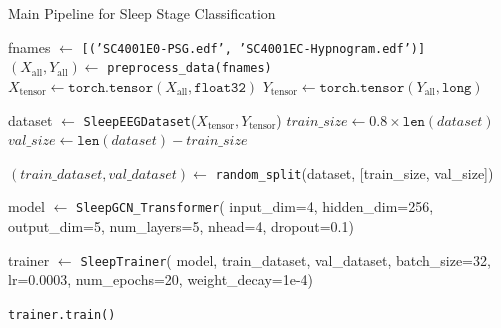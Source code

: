  \begin{algorithm*}[!t]
 	\caption{Main Pipeline for Sleep Stage Classification}
 	\label{alg:main}
 	
 	
 	fnames $\gets$ \texttt{[('SC4001E0-PSG.edf', 'SC4001EC-Hypnogram.edf')]} \;
 	$(X_{\text{all}}, Y_{\text{all}}) \gets$ \texttt{preprocess\_data(fnames)} \;
 	$X_{\text{tensor}} \gets \texttt{torch.tensor}(X_{\text{all}}, \texttt{float32})$ \;
 	$Y_{\text{tensor}} \gets \texttt{torch.tensor}(Y_{\text{all}}, \texttt{long})$ \;
 	
 	dataset $\gets$ \texttt{SleepEEGDataset}($X_{\text{tensor}}, Y_{\text{tensor}}$) \;
 	$train\_size \gets 0.8 \times \texttt{len}(dataset)$ \;
 	$val\_size \gets \texttt{len}(dataset) - train\_size$ \;
 	
 	$(train\_dataset, val\_dataset) \gets$ \texttt{random\_split}(dataset, [train\_size, val\_size]) \;
 	
 	model $\gets$ \texttt{SleepGCN\_Transformer}(\;
 	\Indp
 	input\_dim=4, hidden\_dim=256, output\_dim=5,\;
 	num\_layers=5, nhead=4, dropout=0.1)\;
 	\Indm
 	
 	trainer $\gets$ \texttt{SleepTrainer}(\;
 	\Indp
 	model, train\_dataset, val\_dataset,\;
 	batch\_size=32, lr=0.0003,\;
 	num\_epochs=20, weight\_decay=1e-4)\;
 	\Indm
 	
 	\texttt{trainer.train()} \;
 	
 \end{algorithm*}
 
 
 
 
 
 
 
